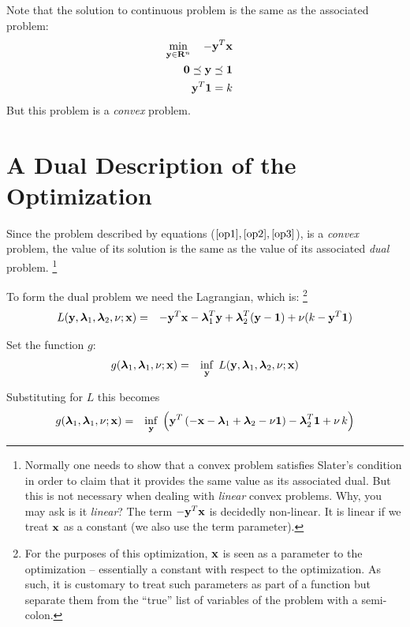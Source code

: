 \documentclass[12pt]{article}
\begin{document}
Note that the solution to continuous problem is the same as the associated problem:
\begin{eqnarray}
	\mathop{\rm min}_{{\bf y} \in {\bf R}^n}\limits \quad -{\bf y}^T {\bf x} && \label{op1} \\ 
	{\bf 0} \preceq {\bf y} \preceq {\bf 1} &&  \label{op2}\\
	{\bf y}^T {\bf 1} =  k \label{op3} &&
\end{eqnarray}
But this problem is a {\it convex\/} problem.

\section{A Dual Description of the Optimization}
Since the problem described by equations ($\ref{op1}, \ref{op2}, \ref{op3}$), is
a {\it convex\/} problem, the value of its solution is the same as the value of 
its associated {\it dual\/} problem.%
\footnote{Normally one needs to show that a convex problem satisfies Slater's condition
	in order to claim that it provides the same value as its associated dual.
But this is not necessary when dealing with {\it linear\/} convex problems. 
Why, you may ask is it {\it linear\/}? The term $-{\bf y}^T {\bf x}$ is
decidedly non-linear. It is linear if we treat ${\bf x}$ as a constant (we also
use the term parameter).}

To form the dual problem we need the Lagrangian, which is:%
\footnote{For the purposes of this optimization, ${\bf x}$ is seen as a parameter
to the optimization -- essentially a constant with respect to the optimization.
As such, it is customary to treat such parameters as part of a function but separate
them from the ``true'' list of variables of the problem with a semi-colon.}
\begin{eqnarray}
	L({\bf y}, {\boldsymbol \lambda}_1, {\boldsymbol \lambda}_2, \nu; {\bf x}) &=& -{\bf y}^T {\bf x} - {\boldsymbol \lambda}_1^T {\bf y} + {\boldsymbol \lambda}_2^T ({\bf y} - {\bf 1}) + \nu (k - {\bf y}^T {\bf 1}) 
\end{eqnarray}

Set the function $g$:
\begin{eqnarray}
	g({\boldsymbol \lambda}_1, {\boldsymbol \lambda}_1, \nu; {\bf x}) &=& \mathop{\rm inf}_{\bf y} \; L({\bf y}, {\boldsymbol \lambda}_1, {\boldsymbol \lambda}_2, \nu; {\bf x}) 
\end{eqnarray}

Substituting for $L$ this becomes
\begin{eqnarray}
	g({\boldsymbol \lambda}_1, {\boldsymbol \lambda}_1, \nu; {\bf x}) &=& \mathop{\rm inf}_{\bf y} \; \left({\bf y}^T \left( -{\bf x} - {\boldsymbol \lambda}_1 + {\boldsymbol \lambda}_2 - \nu {\bf 1} \right) - {\boldsymbol \lambda}_2^T {\bf 1} + \nu \, k  \right)
\end{eqnarray}
\end{document}
